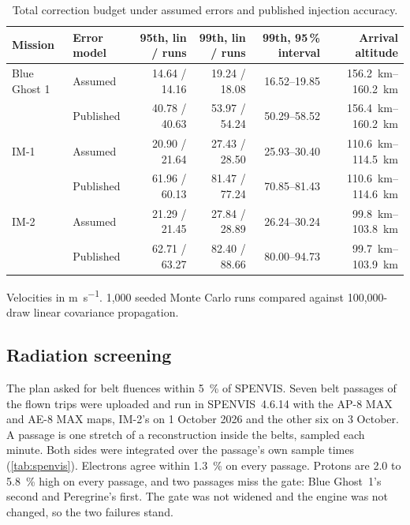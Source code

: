 \documentclass[11pt,a4paper]{article}
\begin{document}
\begin{table}[htbp]
\centering\small
\caption{Total correction budget under assumed errors and published injection accuracy.}
\label{tab:budget}
\setlength{\tabcolsep}{4pt}
\begin{tabular}{@{}llrrrr@{}}
\toprule
Mission & Error model & 95th, lin / runs & 99th, lin / runs & 99th, 95\,\% interval & Arrival altitude \\
\midrule
Blue Ghost 1 & Assumed & 14.64 / 14.16 & 19.24 / 18.08 & 16.52--19.85 & \qtyrange{156.2}{160.2}{\km} \\
             & Published & 40.78 / 40.63 & 53.97 / 54.24 & 50.29--58.52 & \qtyrange{156.4}{160.2}{\km} \\
IM-1         & Assumed & 20.90 / 21.64 & 27.43 / 28.50 & 25.93--30.40 & \qtyrange{110.6}{114.5}{\km} \\
             & Published & 61.96 / 60.13 & 81.47 / 77.24 & 70.85--81.43 & \qtyrange{110.6}{114.6}{\km} \\
IM-2         & Assumed & 21.29 / 21.45 & 27.84 / 28.89 & 26.24--30.24 & \qtyrange{99.8}{103.8}{\km} \\
             & Published & 62.71 / 63.27 & 82.40 / 88.66 & 80.00--94.73 & \qtyrange{99.7}{103.9}{\km} \\
\bottomrule
\end{tabular}
\par\smallskip\footnotesize Velocities in \unit{\m\per\s}. 1,000 seeded Monte Carlo runs compared
against 100,000-draw linear covariance propagation.
\end{table}

\subsection{Radiation screening}

The plan asked for belt fluences within \qty{5}{\percent} of SPENVIS. Seven belt passages
of the flown trips were uploaded and run in SPENVIS~4.6.14 with the AP-8 MAX and AE-8 MAX maps,
IM-2's on 1 October 2026 and the other six on 3 October. A passage is one stretch of a
reconstruction inside the belts, sampled each minute. Both sides were integrated over the
passage's own sample times (\cref{tab:spenvis}). Electrons agree within \qty{1.3}{\percent} on
every passage. Protons are 2.0 to \qty{5.8}{\percent} high on every passage, and two passages
miss the gate: Blue Ghost~1's second and Peregrine's first. The gate was not widened and the
engine was not changed, so the two failures stand.
\end{document}
